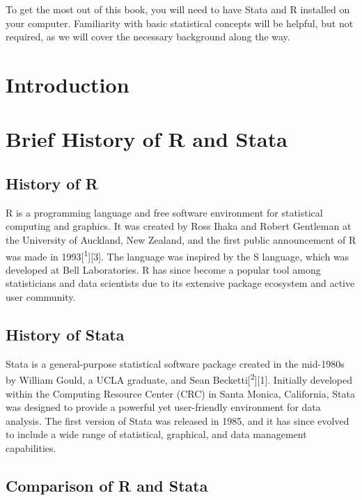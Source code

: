 \documentclass[
  letterpaper,
  DIV=11,
  numbers=noendperiod]{scrreprt}
\begin{document}

To get the most out of this book, you will need to have Stata and R
installed on your computer. Familiarity with basic statistical concepts
will be helpful, but not required, as we will cover the necessary
background along the way.


\chapter{Introduction}\label{introduction}


\chapter{Brief History of R and
Stata}\label{brief-history-of-r-and-stata}

\section{History of R}\label{history-of-r}

R is a programming language and free software environment for
statistical computing and graphics. It was created by Ross Ihaka and
Robert Gentleman at the University of Auckland, New Zealand, and the
first public announcement of R was made in
1993{[}\textsuperscript{1}{]}{[}3{]}. The language was inspired by the S
language, which was developed at Bell Laboratories. R has since become a
popular tool among statisticians and data scientists due to its
extensive package ecosystem and active user community.

\section{History of Stata}\label{history-of-stata}

Stata is a general-purpose statistical software package created in the
mid-1980s by William Gould, a UCLA graduate, and Sean
Becketti{[}\textsuperscript{2}{]}{[}1{]}. Initially developed within the
Computing Resource Center (CRC) in Santa Monica, California, Stata was
designed to provide a powerful yet user-friendly environment for data
analysis. The first version of Stata was released in 1985, and it has
since evolved to include a wide range of statistical, graphical, and
data management capabilities.

\section{Comparison of R and Stata}\label{comparison-of-r-and-stata}
\end{document}
